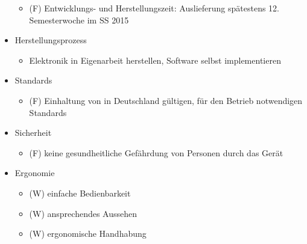 \begin{itemize}
\begin{itemize}
		\item (F) Entwicklungs- und Herstellungszeit: Auslieferung spätestens 12. Semesterwoche im SS 2015
	\end{itemize}
\item Herstellungsprozess
	\begin{itemize}
		\item Elektronik in Eigenarbeit herstellen, Software selbst implementieren
	\end{itemize}
\item Standards
	\begin{itemize}
		\item (F) Einhaltung von in Deutschland gültigen, für den Betrieb notwendigen
	 Standards
	\end{itemize}
\item Sicherheit
	\begin{itemize}
		\item (F) keine gesundheitliche Gefährdung von Personen durch das Gerät
	\end{itemize}
\item Ergonomie
	\begin{itemize}
		\item (W) einfache Bedienbarkeit
		\item (W) ansprechendes Aussehen
		\item (W) ergonomische Handhabung
	\end{itemize}
\end{itemize}